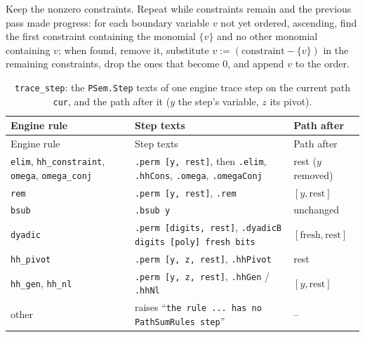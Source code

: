 \begin{algorithm}\label{alg:lean-pathsum-elimorder}
Keep the nonzero constraints. Repeat while constraints remain and the previous pass made
progress: for each boundary variable $v$ not yet ordered, ascending, find the first constraint
containing the monomial $\{v\}$ and no other monomial containing $v$; when found, remove it,
substitute $v := (\text{constraint} - \{v\})$ in the remaining constraints, drop the ones that
become $0$, and append $v$ to the order.
\end{algorithm}

\begin{xltabular}{\textwidth}{@{}>{\raggedright\arraybackslash}p{3.2cm}>{\raggedright\arraybackslash}X>{\raggedright\arraybackslash}p{4.2cm}@{}}
\caption{\texttt{trace\_step}: the \texttt{PSem.Step} texts of one engine trace step on the current
path \texttt{cur}, and the path after it ($y$ the step's variable, $z$ its pivot).}\label{tab:lean-pathsum-trace}\\
\toprule Engine rule & Step texts & Path after\\\midrule\endfirsthead
\toprule Engine rule & Step texts & Path after\\\midrule\endhead
\textnormal{\texttt{elim}}, \textnormal{\texttt{hh\_\allowbreak{}constraint}}, \textnormal{\texttt{omega}}, \textnormal{\texttt{omega\_\allowbreak{}conj}} & \textnormal{\texttt{.\allowbreak{}perm [y,\allowbreak{} rest]}}, then \textnormal{\texttt{.\allowbreak{}elim}}, \textnormal{\texttt{.\allowbreak{}hhCons}}, \textnormal{\texttt{.\allowbreak{}omega}}, \textnormal{\texttt{.\allowbreak{}omegaConj}} & rest ($y$ removed)\\
\textnormal{\texttt{rem}} & \textnormal{\texttt{.\allowbreak{}perm [y,\allowbreak{} rest]}}, \textnormal{\texttt{.\allowbreak{}rem}} & $[y,\text{rest}]$\\
\textnormal{\texttt{bsub}} & \textnormal{\texttt{.\allowbreak{}bsub y}} & unchanged\\
\textnormal{\texttt{dyadic}} & \textnormal{\texttt{.\allowbreak{}perm [digits,\allowbreak{} rest]}}, \textnormal{\texttt{.\allowbreak{}dyadicB digits [poly] fresh bits}} & $[\text{fresh},\text{rest}]$\\
\textnormal{\texttt{hh\_\allowbreak{}pivot}} & \textnormal{\texttt{.\allowbreak{}perm [y,\allowbreak{} z,\allowbreak{} rest]}}, \textnormal{\texttt{.\allowbreak{}hhPivot}} & rest\\
\textnormal{\texttt{hh\_\allowbreak{}gen}}, \textnormal{\texttt{hh\_\allowbreak{}nl}} & \textnormal{\texttt{.\allowbreak{}perm [y,\allowbreak{} z,\allowbreak{} rest]}}, \textnormal{\texttt{.\allowbreak{}hhGen}} / \textnormal{\texttt{.\allowbreak{}hhNl}} & $[y,\text{rest}]$\\
other & raises ``\texttt{the rule ... has no PathSumRules step}'' & --\\
\bottomrule
\end{xltabular}

